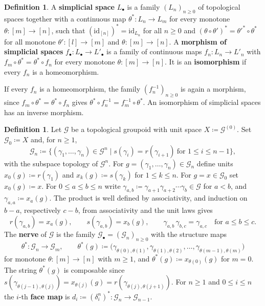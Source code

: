 \documentclass{extracta-temp-26}
\numberwithin{equation}{section}
\theoremstyle{definition}
\newtheorem{defi}[teo]{Definition}
\theoremstyle{remark}
\newcommand{\G}{\mathcal{G}}
\newcommand{\id}{\mathrm{id}}
\newcommand{\term}[1]{\textbf{#1}}
\begin{document}
\begin{defi}\label{def:simplicial}
A \term{simplicial space} \(L_\bullet\) is a family \((L_n)_{n\ge 0}\) of topological spaces together with a continuous map \(\theta^*\colon L_n\to L_m\) for every monotone \(\theta\colon[m]\to[n]\), such that \((\id_{[n]})^*=\id_{L_n}\) for all \(n\ge 0\) and \((\theta\circ\theta')^*=\theta'^*\circ\theta^*\) for all monotone \(\theta'\colon[l]\to[m]\) and \(\theta\colon[m]\to[n]\).
A \term{morphism of simplicial spaces} \(f_\bullet\colon L_\bullet\to L'_\bullet\) is a family of continuous maps \(f_n\colon L_n\to L'_n\) with \(f_m\circ\theta^*=\theta^*\circ f_n\) for every monotone \(\theta\colon[m]\to[n]\).
It is an \term{isomorphism} if every \(f_n\) is a homeomorphism.
\end{defi}

If every \(f_n\) is a homeomorphism, the family \((f_n^{-1})_{n\ge 0}\) is again a morphism, since \(f_m\circ\theta^*=\theta^*\circ f_n\) gives \(\theta^*\circ f_n^{-1}=f_m^{-1}\circ\theta^*\).
An isomorphism of simplicial spaces has an inverse morphism.

\begin{defi}\label{def:nerve}
Let \(\G\) be a topological groupoid with unit space \(X\coloneqq\G^{(0)}\).
Set \(\G_0\coloneqq X\) and, for \(n\ge 1\),
\begin{equation}\label{eq:nerve-n}
\G_n\coloneqq\{(\gamma_1,\dots,\gamma_n)\in\G^n\mid s(\gamma_i)=r(\gamma_{i+1})\ \text{for }1\le i\le n-1\},
\end{equation}
with the subspace topology of \(\G^n\).
For \(g=(\gamma_1,\dots,\gamma_n)\in\G_n\) define units \(x_0(g)\coloneqq r(\gamma_1)\) and \(x_k(g)\coloneqq s(\gamma_k)\) for \(1\le k\le n\).
For \(g=x\in\G_0\) set \(x_0(g)\coloneqq x\).
For \(0\le a\le b\le n\) write \(\gamma_{a,b}\coloneqq\gamma_{a+1}\gamma_{a+2}\cdots\gamma_b\in\G\) for \(a<b\), and \(\gamma_{a,a}\coloneqq x_a(g)\).
The product is well defined by associativity, and induction on \(b-a\), respectively \(c-b\), from associativity and the unit laws gives
\begin{equation}\label{eq:partial-products}
r(\gamma_{a,b})=x_a(g),\qquad
s(\gamma_{a,b})=x_b(g),\qquad
\gamma_{a,b}\,\gamma_{b,c}=\gamma_{a,c}\quad\text{for } a\le b\le c.
\end{equation}
The \term{nerve} of \(\G\) is the family \(\G_\bullet=(\G_n)_{n\ge 0}\) with the structure maps
\begin{equation}\label{eq:nerve-structure}
\theta^*\colon\G_n\to\G_m,
\qquad
\theta^*(g)\coloneqq\bigl(\gamma_{\theta(0),\theta(1)},\gamma_{\theta(1),\theta(2)},\dots,\gamma_{\theta(m-1),\theta(m)}\bigr)
\end{equation}
for monotone \(\theta\colon[m]\to[n]\) with \(m\ge 1\), and \(\theta^*(g)\coloneqq x_{\theta(0)}(g)\) for \(m=0\).
The string \(\theta^*(g)\) is composable since \(s(\gamma_{\theta(j-1),\theta(j)})=x_{\theta(j)}(g)=r(\gamma_{\theta(j),\theta(j+1)})\).
For \(n\ge 1\) and \(0\le i\le n\) the \(i\)-th \term{face map} is \(d_i\coloneqq(\delta^n_i)^*\colon\G_n\to\G_{n-1}\).
\end{defi}
\end{document}
